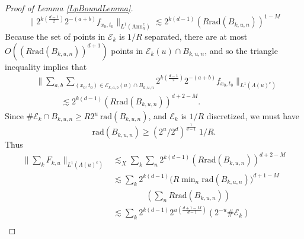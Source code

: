 \begin{proof}[Proof of Lemma \ref{LpBoundLemma}]
\begin{equation}
    \| 2^{k \left( \frac{d-1}{2} \right)} 2^{-(a+b)} f_{x_0,t_0} \|_{L^1(\text{Ann}_n^c)} \lesssim 2^{k(d-1)} (R \text{rad}(B_{k,u,n}))^{1 - M}
\end{equation}
%
%
% 
%
Because the set of points in $\mathcal{E}_k$ is $1/R$ separated, there are at most $O( (R \text{rad}(B_{k,u,n}))^{d+1} )$ points in $\mathcal{E}_k(u) \cap B_{k,u,n}$, and so the triangle inequality implies that
\begin{equation}
\begin{split}
    &\Big\| \sum\nolimits_{a,b} \sum\nolimits_{(x_0,t_0) \in \mathcal{E}_{k,a,b}(u) \cap B_{k,u,n}} 2^{k \left( \frac{d-1}{2} \right)} 2^{-(a+b)} f_{x_0,t_0} \Big\|_{L^1(\Lambda(u)^c)}\\
    &\quad\quad\quad \lesssim 2^{k (d - 1)} (R \text{rad}(B_{k,u,n}))^{d + 2 - M}.
\end{split}
\end{equation}
%
Since $\# \mathcal{E}_k \cap B_{k,u,n} \geq R 2^{u}\ \text{rad}(B_{k,u,n})$, and $\mathcal{E}_k$ is $1/R$ discretized, we must have
%
\begin{equation}
    \text{rad}(B_{k,u,n}) \geq (2^u / 2^d)^{\frac{1}{d-1}}\; 1/R.
\end{equation}
%
Thus
%
%
\begin{equation}
\begin{split}
    \Big\| \sum\nolimits_k F_{k,u} \Big\|_{L^1(\Lambda(u)^c)} &\lesssim_X \sum\nolimits_k \sum\nolimits_n 2^{k (d-1)} (R \text{rad}(B_{k,u,n}))^{d + 2 - M}\\
    &\lesssim \sum\nolimits_k 2^{k(d-1)} \Big( R \min\nolimits_n \text{rad}(B_{k,u,n}) \Big)^{d + 1 - M}\\
    &\quad\quad\quad\quad \left( \sum\nolimits_n R \text{rad}(B_{k,u,n}) \right) \\
    &\lesssim \sum\nolimits_k 2^{k (d-1)} 2^{u \left( \frac{d+1-M}{d-1} \right)} \left( 2^{-u} \# \mathcal{E}_k \right)\\

\end{split}
\end{equation}
\end{proof}
